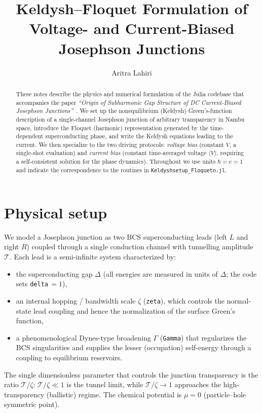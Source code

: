 \documentclass[11pt,a4paper]{article}
\title{\bf Keldysh--Floquet Formulation of Voltage- and
Current-Biased Josephson Junctions}
\author{Aritra Lahiri}
\date{}
\begin{document}
\maketitle

\begin{abstract}
These notes describe the physics and numerical formulation of the Julia codebase that 
accompanies the paper \emph{``Origin of Subharmonic Gap Structure of DC Current-Biased
Josephson Junctions''}~\cite{Lahiri2025SGS}.  We set up the nonequilibrium (Keldysh) Green's-function description
of a single-channel Josephson junction of arbitrary transparency in Nambu space, introduce 
the Floquet (harmonic) representation generated by the time-dependent
superconducting phase, and write the Keldysh equations leading to the current.
We then specialize to the two driving protocols: \emph{voltage bias}
(constant $V$, a single-shot evaluation) and \emph{current bias} (constant
time-averaged voltage $\langle V\rangle$, requiring a self-consistent solution
for the phase dynamics).  Throughout we use units $\hbar=e=1$ and indicate the
correspondence to the routines in \texttt{Keldyshsetup\_Floquetn.jl}.
\end{abstract}

\tableofcontents

\section{Physical setup}
\label{sec:setup}

We model a Josephson junction as two BCS superconducting leads (left $L$ and
right $R$) coupled through a single conduction channel with tunnelling amplitude 
$\mathcal{T}$.  Each lead is a semi-infinite system characterized by:
\begin{itemize}
  \item the superconducting gap $\Delta$ (all energies are measured in units of
        $\Delta$; the code sets \texttt{delta}\,$=1$),
  \item an internal hopping / bandwidth scale $\zeta$ (\texttt{zeta}), which
        controls the normal-state lead coupling and hence the normalization of
        the surface Green's function,
  \item a phenomenological Dynes-type broadening $\Gamma$ (\texttt{Gamma}) that
        regularizes the BCS singularities and supplies the lesser (occupation)
        self-energy through a coupling to equilibrium reservoirs.
\end{itemize}
The single dimensionless parameter that controls the junction transparency is
the ratio $\mathcal{T}/\zeta$: $\mathcal{T}/\zeta\ll 1$ is the tunnel limit,
while $\mathcal{T}/\zeta\to 1$ approaches the high-transparency (ballistic)
regime.  The chemical potential is $\mu=0$ (particle--hole symmetric point).
\end{document}
